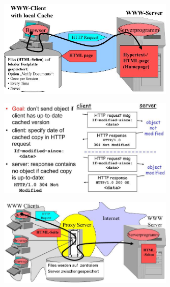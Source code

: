 \documentclass[ngerman,a4paper,12pt]{scrreprt}
\begin{document}
\ul
	\li 

\ulE

\begin{figure}[H]
	\centering
	\includegraphics[width=0.75\textwidth]{img/V14.12.jpg}
	\caption{}
	\label{}
\end{figure}

\begin{figure}[H]
	\centering
	\includegraphics[width=0.75\textwidth]{img/V14.13.jpg}
	\caption{}
	\label{}
\end{figure}

\begin{figure}[H]
	\centering
	\includegraphics[width=0.75\textwidth]{img/V14.14.jpg}
	\caption{}
	\label{}
\end{figure}
\end{document}
